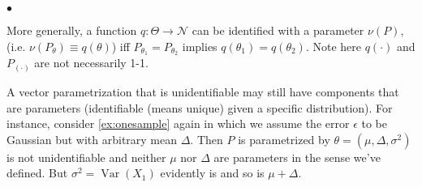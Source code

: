 \documentclass{article}
\begin{document}
$\bullet$ 

More generally, a function $q: \Theta \rightarrow \mathcal{N}$ can be identified with a parameter $\nu(P)$, (i.e. $\nu\left(P_{\theta}\right) \equiv q(\theta)$) iff $P_{\theta_{1}}=P_{\theta_{2}}$ implies $q\left(\theta_{1}\right)=q\left(\theta_{2}\right)$. Note here $q(\cdot)$ and $P_{(\cdot)}$ are not necessarily 1-1.

\begin{rema}
A vector parametrization that is unidentifiable may still have components that are parameters (identifiable (means unique) given a specific distribution). For instance, consider \cref{ex:onesample} again in which we assume the error $\epsilon$ to be Gaussian but with arbitrary mean $\Delta$. Then $P$ is parametrized by $\theta=\left(\mu, \Delta, \sigma^{2}\right)$ is not unidentifiable and neither $\mu$ nor $\Delta$ are parameters in the sense we've defined. But $\sigma^{2}=\operatorname{Var}\left(X_{1}\right)$ evidently is and so is $\mu+\Delta$.
\end{rema}
\end{document}
